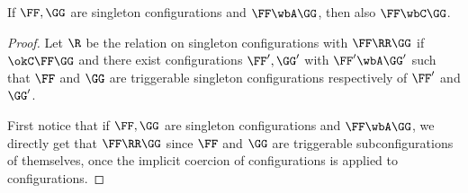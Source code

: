 \begin{lemma}
\label{l:OGS_COGS}
If $\FF, \GG$ are \AOGS singleton configurations and 
$\FF \wbA \GG$, then also $\FF \wbC \GG$. 
\end{lemma}

\begin{proof}
  Let $\R$ be the relation on \COGS singleton configurations with $\FF \RR \GG$ if
   $\okC \FF\GG$ and there exist \AOGS configurations $\FF', \GG'$
    with $\FF' \wbA \GG'$ such that 
    $\FF$ and $\GG$ are triggerable singleton configurations
    respectively of $\FF'$ and $\GG'$.

  First notice that if $\FF, \GG$ are \AOGS singleton configurations and 
  $\FF \wbA \GG$, we directly get that 
  $\FF \RR \GG$ since $\FF$ and $\GG$ are 
  triggerable subconfigurations of themselves,
  once the implicit coercion of \AOGS configurations is applied
  to \COGS configurations.
  

\end{proof}
